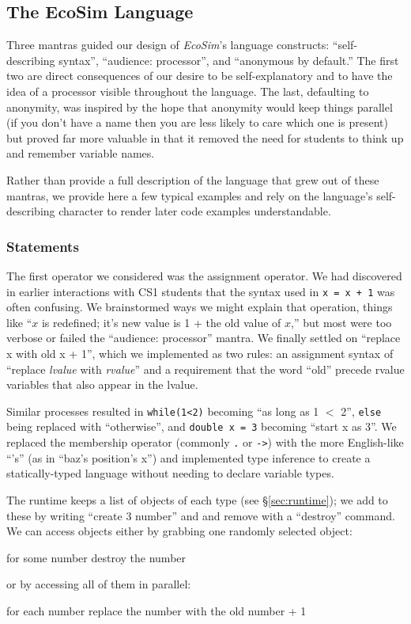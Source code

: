 \documentclass{sig-alternate}
\newcommand{\INDSTATE}[1][1]{\STATE\hspace{#1\algorithmicindent}}
\newcommand{\EcoSim}{\emph{EcoSim}}
\newenvironment{snippet}{\begin{algorithmic}[1]}{\end{algorithmic}}
\begin{document}
\subsection{The EcoSim Language}
Three mantras guided our design of \EcoSim{}'s language constructs:
``self-describing syntax'', ``audience: processor'', and ``anonymous by default.''
The first two are direct consequences of our desire to be self-explanatory 
and to have the idea of a processor visible throughout the language.
The last, defaulting to anonymity,
was inspired by the hope that anonymity would keep things parallel 
(if you don't have a name then you are less likely to care which one is present)
but proved far more valuable in that it removed the need 
for students to think up and remember variable names.

Rather than provide a full description of the language that grew out of these mantras,
we provide here a few typical examples
and rely on the language's self-describing character 
to render later code examples understandable.

\subsubsection{Statements}
The first operator we considered was the assignment operator.
We had discovered in earlier interactions with CS1 students
that the syntax used in \texttt{x = x + 1} was often confusing.
We brainstormed ways we might explain that operation,
things like ``$x$ is redefined; it's new value is 1 + the old value of $x$,''
but most were too verbose or failed the ``audience: processor'' mantra.
We finally settled on ``replace x with old x + 1'',
which we implemented as two rules:
an assignment syntax of ``replace \emph{lvalue} with \emph{rvalue}''
and a requirement that the word ``old'' precede rvalue variables that also appear in the lvalue.

Similar processes resulted in 
\texttt{while(1<2)} becoming ``as long as 1 $<$ 2'',
\texttt{else} being replaced with ``otherwise'', 
and \texttt{double x = 3} becoming ``start x as 3''.
We replaced the membership operator (commonly \texttt{.} or \mbox{\texttt{->}})
with the more English-like ``'s'' (as in ``baz's position's x'')
and implemented type inference to create a statically-typed language 
without needing to declare variable types.

The runtime keeps a list of objects of each type (see \S\ref{sec:runtime});
we add to these by writing ``create 3 number'' and and remove with a ``destroy'' command.
We can access objects either by grabbing one randomly selected object:
\begin{snippet}
\STATE for some number
\INDSTATE destroy the number
\end{snippet}
or by accessing all of them in parallel:
\begin{snippet}
\STATE for each number
\INDSTATE replace the number with the old number + 1
\end{snippet}
\end{document}
